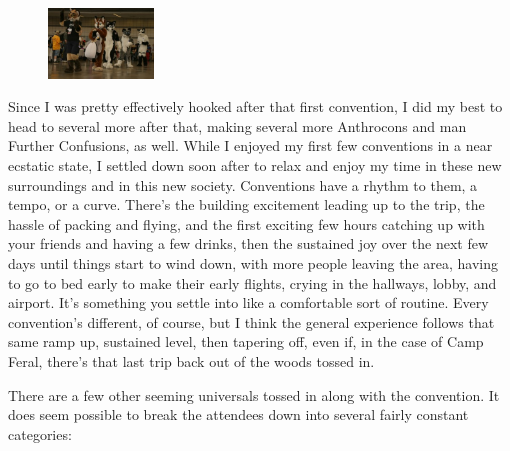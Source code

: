 \begin{figure}
  \begin{center}
    \includegraphics[width=0.25\textwidth]{content/assets/convention-mystique--parade}
  \end{center}
\end{figure}
Since I was pretty effectively hooked after that first convention, I did my best to head to several more after that, making several more Anthrocons and man Further Confusions, as well.  While I enjoyed my first few conventions in a near ecstatic state, I settled down soon after to relax and enjoy my time in these new surroundings and  in this new society.  Conventions have a rhythm to them, a tempo, or a curve.  There's the building excitement leading up to the trip, the hassle of packing and flying, and the first exciting few hours catching up with your friends and having a few drinks, then the sustained joy over the next few days until things start to wind down, with more people leaving the area, having to go to bed early to make their early flights, crying in the hallways, lobby, and airport.  It's something you settle into like a comfortable sort of routine.  Every convention's different, of course, but I think the general experience follows that same ramp up, sustained level, then tapering off, even if, in the case of Camp Feral, there's that last trip back out of the woods tossed in.

There are a few other seeming universals tossed in along with the convention.  It does seem possible to break the attendees down into several fairly constant categories:

